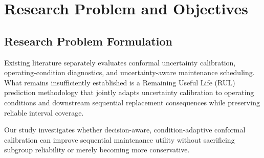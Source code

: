 \section{Research Problem and Objectives}

\subsection{Research Problem Formulation}
Existing literature separately evaluates conformal uncertainty calibration, operating-condition diagnostics, and uncertainty-aware maintenance scheduling. What remains insufficiently established is a Remaining Useful Life (RUL) prediction methodology that jointly adapts uncertainty calibration to operating conditions and downstream sequential replacement consequences while preserving reliable interval coverage.

Our study investigates whether decision-aware, condition-adaptive conformal calibration can improve sequential maintenance utility without sacrificing subgroup reliability or merely becoming more conservative.

